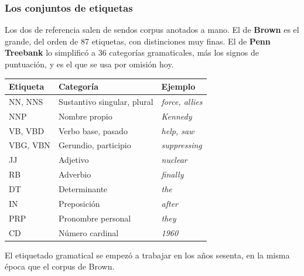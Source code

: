 \documentclass[11pt,letterpaper]{article}
\begin{document}
\subsubsection*{Los conjuntos de etiquetas}

Los dos de referencia salen de sendos corpus anotados a mano. El de
\textbf{Brown} es el grande, del orden de 87 etiquetas, con
distinciones muy finas. El de \textbf{Penn Treebank} lo simplificó a 36
categorías gramaticales, más los signos de puntuación, y es el que se
usa por omisión hoy.

\begin{center}
\begin{tabular}{lll}
    \toprule
    \textbf{Etiqueta} & \textbf{Categoría} & \textbf{Ejemplo} \\
    \midrule
    NN, NNS   & Sustantivo singular, plural  & \textit{force, allies} \\
    NNP       & Nombre propio                & \textit{Kennedy} \\
    VB, VBD   & Verbo base, pasado           & \textit{help, saw} \\
    VBG, VBN  & Gerundio, participio         & \textit{suppressing} \\
    JJ        & Adjetivo                     & \textit{nuclear} \\
    RB        & Adverbio                     & \textit{finally} \\
    DT        & Determinante                 & \textit{the} \\
    IN        & Preposición                  & \textit{after} \\
    PRP       & Pronombre personal           & \textit{they} \\
    CD        & Número cardinal              & \textit{1960} \\
    \bottomrule
\end{tabular}
\end{center}

\begin{observacion}
    El etiquetado gramatical se empezó a trabajar en los años sesenta,
    en la misma época que el corpus de Brown.
\end{observacion}



\newpage



\end{document}
